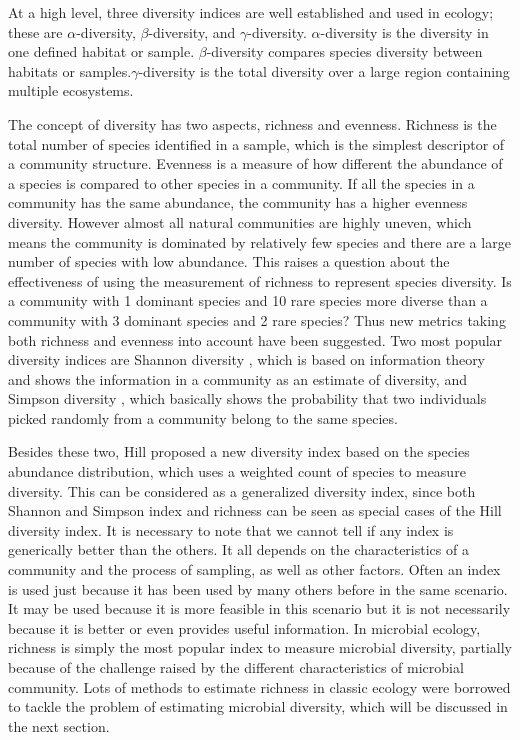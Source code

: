 At a high level, three diversity indices are well established and used in
ecology; these are $\alpha$-diversity, $\beta$-diversity, and
$\gamma$-diversity. $\alpha$-diversity is the diversity in one defined habitat
or sample. $\beta$-diversity compares species diversity between habitats or
samples.$\gamma$-diversity is the total diversity over a large region
containing multiple ecosystems\cite{magurran2011biological}.

The concept of diversity has two aspects, richness and evenness. Richness is
the total number of species identified in a sample, which is the simplest
descriptor of a community structure. Evenness is a measure of how different the
abundance of a species is compared to other species in a community. If all the
species in a community has the same abundance, the community has a higher
evenness diversity. However almost all natural communities are highly uneven,
which means the community is dominated by relatively few species and there are
a large number of species with low abundance. This raises a question about the
effectiveness of using the measurement of richness to represent species
diversity. Is a community with 1 dominant species and 10 rare species more
diverse than a community with 3 dominant species and 2 rare species? Thus new
metrics taking both richness and evenness into account have been suggested. Two
most popular diversity indices are Shannon diversity
\cite{shannon2001mathematical}, which is based on information theory and shows
the information in a community as an estimate of diversity, and Simpson
diversity \cite{simpson1949measurement}, which basically shows the probability
that two individuals picked randomly from a community belong to the same
species.

Besides these two, Hill \cite{hill1973diversity} proposed a new diversity index
based on the species abundance distribution, which uses a weighted count of
species to measure diversity. This can be considered as a generalized diversity
index, since both Shannon and Simpson index and richness can be seen as special
cases of the Hill diversity index. It is necessary to note that we cannot tell
if any index is generically better than the others. It all depends on the
characteristics of a community and the process of sampling, as well as other
factors. Often an index is used just because it has been used by many others
before in the same scenario. It may be used because it is more feasible in this
scenario but it is not necessarily because it is better or even provides useful
information.
% 
In microbial ecology, richness is simply the most popular index to measure
microbial diversity, partially because of the challenge raised by the different
characteristics of microbial community. Lots of methods to estimate richness in
classic ecology were borrowed to tackle the problem of estimating microbial
diversity, which will be discussed in the next section.
%
